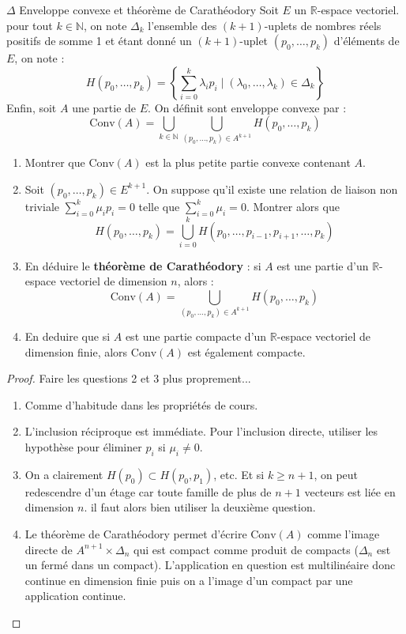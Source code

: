 \documentclass[french,a4paper]{article}
\newcommand{\N}{\mathbb{N}}
\newcommand{\R}{\mathbb{R}}
\theoremstyle{plain}
\theoremstyle{definition}
\theoremstyle{remark}
\begin{document}
\begin{ex}[Moulin.08]{$\Delta$ Enveloppe convexe et théorème de Carathéodory}
	Soit $E$ un $\R$-espace vectoriel. pour tout $k\in\N$, on note $\Delta_k$ l'ensemble des $(k+1)$-uplets de nombres réels positifs de somme 1 et étant donné un $(k+1)$-uplet $(p_0,\ldots,p_k)$ d'éléments de $E$, on note : $$H(p_0,\ldots,p_k)=\left\{\sum_{i=0}^{k}\lambda_ip_i \mid (\lambda_0,\ldots,\lambda_k)\in\Delta_k\right\}$$ Enfin, soit $A$ une partie de $E$. On définit sont enveloppe convexe par : $$\text{Conv}(A)=\bigcup_{k\in\N}\bigcup_{(p_0,\ldots,p_k)\in A^{k+1}}H(p_0,\ldots,p_k)$$
	\begin{enumerate}
		\item Montrer que $\text{Conv}(A)$ est la plus petite partie convexe contenant $A$.
		\item Soit $(p_0,\ldots,p_k)\in E^{k+1}$. On suppose qu'il existe une relation de liaison non triviale $\displaystyle\sum_{i=0}^{k}\mu_ip_i=0$ telle que $\displaystyle\sum_{i=0}^{k}\mu_i=0$. Montrer alors que $$H(p_0,\ldots,p_k)=\bigcup_{i=0}^{k}H(p_0,\ldots,p_{i-1},p_{i+1},\ldots,p_k)$$
		\item En déduire le \textbf{théorème de Carathéodory} : si $A$ est une partie d'un $\R$-espace vectoriel de dimension $n$, alors : $$\text{Conv}(A)=\bigcup_{(p_0,\ldots,p_k)\in A^{k+1}}H(p_0,\ldots,p_k)$$
		\item En deduire que si $A$ est une partie compacte d'un $\R$-espace vectoriel de dimension finie, alors $\text{Conv}(A)$ est également compacte.
	\end{enumerate}
\end{ex}
\begin{proof}
	Faire les questions 2 et 3 plus proprement...
	\begin{enumerate}
		\item Comme d'habitude dans les propriétés de cours.
		\item L'inclusion réciproque est immédiate. Pour l'inclusion directe, utiliser les hypothèse pour éliminer $p_i$ si $\mu_i\ne 0$.
		\item On a clairement $H(p_0)\subset H(p_0,p_1)$, etc. Et si $k\geqslant n+1$, on peut redescendre d'un étage car toute famille de plus de $n+1$ vecteurs est liée en dimension $n$. il faut alors bien utiliser la deuxième question.
		\item Le théorème de Carathéodory permet d'écrire $\text{Conv}(A)$ comme l'image directe de $A^{n+1}\times\Delta_n$ qui est compact comme produit de compacts ($\Delta_n$ est un fermé dans un compact). L'application en question est multilinéaire donc continue en dimension finie puis on a l'image d'un compact par une application continue.
	\end{enumerate}
\end{proof}
\end{document}
